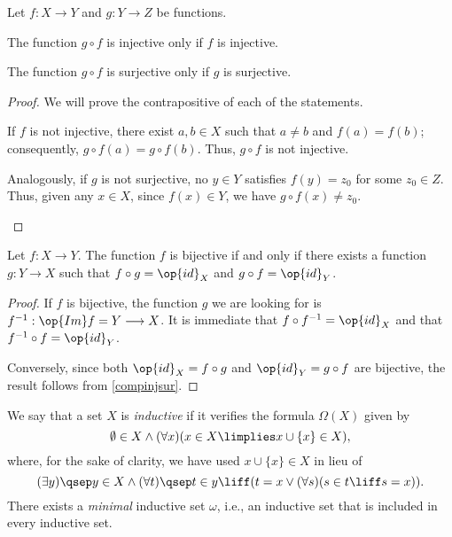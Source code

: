 \begin{proposition}
Let $f:X\longrightarrow Y$ and $g:Y\longrightarrow Z$ be functions.
\begin{statements}
\item The function $g\circ f$ is injective only if $f$ is injective.
\item The function $g\circ f$ is surjective only if $g$ is surjective.
\end{statements}
\label{compinjsur}
\end{proposition}

\begin{proof}
We will prove the contrapositive of each of the statements.

\begin{parlist}
\item If $f$ is not injective, there exist $a,b\in X$ such that $a\neq b$ and $f(a) = f(b)$; consequently, $g\circ f(a) = g \circ f(b)$. Thus, $g\circ f$ is not injective.
\item Analogously, if $g$ is not surjective, no $y\in Y$ satisfies $f(y) = z_0$ for some $z_0\in Z$. Thus, given any $x\in X$, since $f(x) \in Y$, we have $g\circ f(x) \neq z_0$.
\end{parlist}
\end{proof}

\begin{proposition}
Let $f: X\longrightarrow Y$. The function $f$ is bijective if and only if there exists a function $g:Y\longrightarrow X$ such that $f\circ g = \op{id}_X$ and $g\circ f =\op{id}_Y$.
\label{<+label+>}
\end{proposition}

\begin{proof}
If $f$ is bijective, the function $g$ we are looking for is $f^{-1} : \op{Im} f = Y \longrightarrow X$. It is immediate that $f \circ f^{-1} = \op{id}_X$ and that $f^{-1}\circ f = \op{id}_Y$.

Conversely, since both $\op{id}_X = f\circ g$ and $\op{id}_Y = g\circ f$ are bijective, the result follows from \ref{compinjsur}.
\end{proof}


\begin{para}
We say that a set $X$ is \emph{inductive} if it verifies the formula $\Omega(X)$ given by
\[ \emptyset \in X \land (\forall x)(x\in X \limplies x \cup \{x\} \in X),\]
where, for the sake of clarity, we have used $x\cup\{x\}\in X$ in lieu of
\[(\exists y)\qsep y \in X \land (\forall t)\qsep t\in y\liff(t = x \lor (\forall s)(s\in t \liff s = x )).\]
There exists a \emph{minimal} inductive set $\omega$, i.e., an inductive set that is included in every inductive set.
\label{<+label+>}
\end{para}

